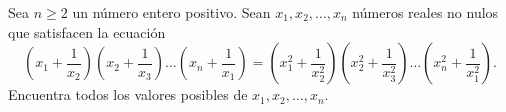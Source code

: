 Sea $n\ge 2$ un número entero positivo. Sean $x_1, x_2, \dots, x_n$ números reales no nulos que satisfacen la ecuación
\[\left(x_1+\frac{1}{x_2}\right)\left(x_2+\frac{1}{x_3}\right)\dots\left(x_n+\frac{1}{x_1}\right)=\left(x_1^2+\frac{1}{x_2^2}\right)\left(x_2^2+\frac{1}{x_3^2}\right)\dots\left(x_n^2+\frac{1}{x_1^2}\right). \]
Encuentra todos los valores posibles de $x_1, x_2, \dots, x_n$.

